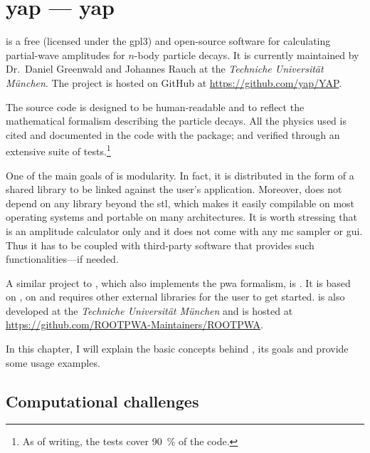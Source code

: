 \chapter{\texorpdfstring{\acs{yap} --- \acl{yap}}{YAP - Yet Another PWA Toolkit}}
\label{chap:yap}

     is a free (licensed under the \acs{gpl3}) and open-source \cpp[11] software for calculating partial-wave amplitudes for $n$-body particle decays.
    It is currently maintained by Dr.~Daniel Greenwald and Johannes Rauch at the \textsl{Techniche Universit\"at M\"unchen}.
    The project is hosted on \textsf{GitHub} at \url{https://github.com/yap/YAP}.


    The source code is designed to be human-readable and to reflect the mathematical formalism describing the particle decays.
    All the physics used is cited and documented in the code with the  package; and verified through an extensive suite of tests.\footnote{As of writing, the tests cover \SI{90}{\percent} of the code.}


    One of the main goals of  is modularity.
    In fact, it is distributed in the form of a shared library to be linked against the user's application.
    Moreover,  does not depend on any library beyond the \cpp{} \ac{stl}, which makes it easily compilable on most operating systems and portable on many architectures.
    It is worth stressing that  is an amplitude calculator only and it does not come with any \ac{mc} sampler or \ac{gui}.
    Thus it has to be coupled with third-party software that provides such functionalities---if needed.


    A similar project to , which also implements the \ac{pwa} formalism, is {\footnotesize{}}.
    It is based on \ROOT{}, on  and requires other external libraries for the user to get started.
    {\footnotesize{}} is also developed at the \textsl{Techniche Universit\"at M\"unchen} and is hosted at \url{https://github.com/ROOTPWA-Maintainers/ROOTPWA}.


    In this chapter, I will explain the basic concepts behind , its goals and provide some usage examples.


    \section{Computational challenges}


